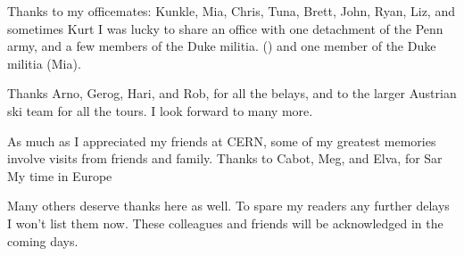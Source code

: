 Thanks to my officemates: Kunkle, Mia, Chris, Tuna, Brett, John, Ryan, Liz, and sometimes Kurt
I was lucky to share an office with one detachment of the Penn army, and a few members of the Duke militia. () and one member of the Duke militia (Mia).

Thanks Arno, Gerog, Hari, and Rob, for all the belays, and to the larger Austrian ski team for all the tours. I look forward to many more.

As much as I appreciated my friends at CERN, some of my greatest memories involve visits from friends and family.
Thanks to Cabot, Meg, and Elva, for Sar
My time in Europe 

Many others deserve thanks here as well.
To spare my readers any further delays I won't list them now.
These colleagues and friends will be acknowledged in the coming days.








